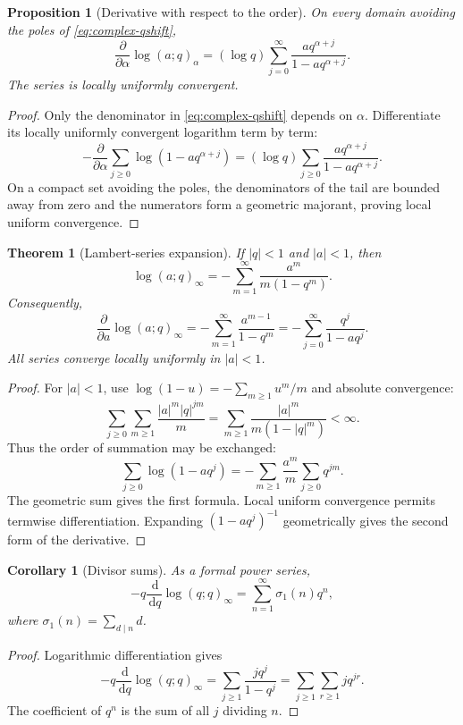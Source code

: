 \documentclass[11pt,oneside,openany]{book}
\newtheorem{theorem}{Theorem}[chapter]
\newtheorem{proposition}[proposition]{Proposition}
\newtheorem{corollary}[corollary]{Corollary}
\theoremstyle{definition}
\theoremstyle{remark}
\newcommand{\dd}{\,\mathrm d}
\newcommand{\abs}[1]{\lvert #1\rvert}
\begin{document}
\begin{proposition}[Derivative with respect to the order]\label{prop:order-derivative}
On every domain avoiding the poles of \eqref{eq:complex-qshift},
\[
 \frac{\partial}{\partial\alpha}\log(a;q)_\alpha
 =(\log q)\sum_{j=0}^{\infty}
 \frac{aq^{\alpha+j}}{1-aq^{\alpha+j}}.
 \tag{1.4}\label{eq:order-derivative}
\]
The series is locally uniformly convergent.
\end{proposition}

\begin{proof}
Only the denominator in \eqref{eq:complex-qshift} depends on $\alpha$.  Differentiate its locally uniformly convergent logarithm term by term:
\[
 -\frac{\partial}{\partial\alpha}
 \sum_{j\ge0}\log(1-aq^{\alpha+j})
 =(\log q)\sum_{j\ge0}
 \frac{aq^{\alpha+j}}{1-aq^{\alpha+j}}.
\]
On a compact set avoiding the poles, the denominators of the tail are bounded away from zero and the numerators form a geometric majorant, proving local uniform convergence.
\end{proof}

\begin{theorem}[Lambert-series expansion]\label{thm:lambert-log}
If $\abs q<1$ and $\abs a<1$, then
\[
 \log(a;q)_\infty
 =-\sum_{m=1}^{\infty}\frac{a^m}{m(1-q^m)}.
\]
Consequently,
\[
 \frac{\partial}{\partial a}\log(a;q)_\infty
 =-\sum_{m=1}^{\infty}\frac{a^{m-1}}{1-q^m}
 =-\sum_{j=0}^{\infty}\frac{q^j}{1-aq^j}.
\]
All series converge locally uniformly in $\abs a<1$.
\end{theorem}

\begin{proof}
For $\abs a<1$, use $\log(1-u)=-\sum_{m\ge1}u^m/m$ and absolute convergence:
\[
 \sum_{j\ge0}\sum_{m\ge1}\frac{\abs a^m\abs q^{jm}}{m}
 =\sum_{m\ge1}\frac{\abs a^m}{m(1-\abs q^m)}<\infty.
\]
Thus the order of summation may be exchanged:
\[
 \sum_{j\ge0}\log(1-aq^j)
 =-\sum_{m\ge1}\frac{a^m}{m}\sum_{j\ge0}q^{jm}.
\]
The geometric sum gives the first formula.  Local uniform convergence permits termwise differentiation.  Expanding $(1-aq^j)^{-1}$ geometrically gives the second form of the derivative.
\end{proof}

\begin{corollary}[Divisor sums]\label{cor:divisor-sum}
As a formal power series,
\[
 -q\frac{\dd}{\dd q}\log(q;q)_\infty
 =\sum_{n=1}^{\infty}\sigma_1(n)q^n,
\]
where $\sigma_1(n)=\sum_{d\mid n}d$.
\end{corollary}

\begin{proof}
Logarithmic differentiation gives
\[
 -q\frac{\dd}{\dd q}\log(q;q)_\infty
 =\sum_{j\ge1}\frac{j q^j}{1-q^j}
 =\sum_{j\ge1}\sum_{r\ge1}j q^{jr}.
\]
The coefficient of $q^n$ is the sum of all $j$ dividing $n$.
\end{proof}
\end{document}
